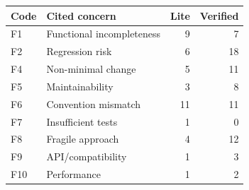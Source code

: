 \begin{tabular}{llrr}
\toprule
Code & Cited concern & Lite & Verified \\
\midrule
F1 & Functional incompleteness & 9 & 7 \\
F2 & Regression risk & 6 & 18 \\
F4 & Non-minimal change & 5 & 11 \\
F5 & Maintainability & 3 & 8 \\
F6 & Convention mismatch & 11 & 11 \\
F7 & Insufficient tests & 1 & 0 \\
F8 & Fragile approach & 4 & 12 \\
F9 & API/compatibility & 1 & 3 \\
F10 & Performance & 1 & 2 \\
\bottomrule
\end{tabular}
